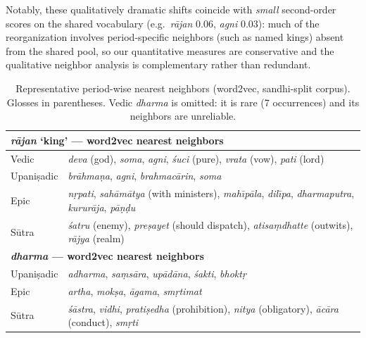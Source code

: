 \documentclass[11pt]{article}
\begin{document}
Notably, these qualitatively dramatic shifts coincide with \emph{small} second-order scores on the shared vocabulary (e.g.\ \textit{r\=ajan} $0.06$, \textit{agni} $0.03$): much of the reorganization involves period-specific neighbors (such as named kings) absent from the shared pool, so our quantitative measures are conservative and the qualitative neighbor analysis is complementary rather than redundant.

\begin{table}[t]
\centering
\small
\begin{tabular}{p{1.6cm} p{12.2cm}}
\toprule
\multicolumn{2}{l}{\textbf{\textit{r\=ajan} `king' --- word2vec nearest neighbors}} \\
\midrule
Vedic & \textit{deva} (god), \textit{soma}, \textit{agni}, \textit{\'suci} (pure), \textit{vrata} (vow), \textit{pati} (lord) \\
Upani\d{s}adic & \textit{br\=ahma\d{n}a}, \textit{agni}, \textit{brahmac\=arin}, \textit{soma} \\
Epic & \textit{n\d{r}pati}, \textit{sah\=am\=atya} (with ministers), \textit{mah\={\i}p\=ala}, \textit{dil\={\i}pa}, \textit{dharmaputra}, \textit{kurur\=aja}, \textit{p\=a\d{n}\d{d}u} \\
S\=utra & \textit{\'satru} (enemy), \textit{pre\d{s}ayet} (should dispatch), \textit{atisa\d{m}dhatte} (outwits), \textit{r\=ajya} (realm) \\
\midrule
\multicolumn{2}{l}{\textbf{\textit{dharma} --- word2vec nearest neighbors}} \\
\midrule
Upani\d{s}adic & \textit{adharma}, \textit{sa\d{m}s\=ara}, \textit{up\=ad\=ana}, \textit{\'sakti}, \textit{bhokt\d{r}} \\
Epic & \textit{artha}, \textit{mok\d{s}a}, \textit{\=agama}, \textit{sm\d{r}timat} \\
S\=utra & \textit{\'s\=astra}, \textit{vidhi}, \textit{prati\d{s}edha} (prohibition), \textit{nitya} (obligatory), \textit{\=ac\=ara} (conduct), \textit{sm\d{r}ti} \\
\bottomrule
\end{tabular}
\caption{Representative period-wise nearest neighbors (word2vec, sandhi-split corpus). Glosses in parentheses. Vedic \textit{dharma} is omitted: it is rare (7 occurrences) and its neighbors are unreliable.}
\label{tab:cases}
\end{table}

\end{document}

